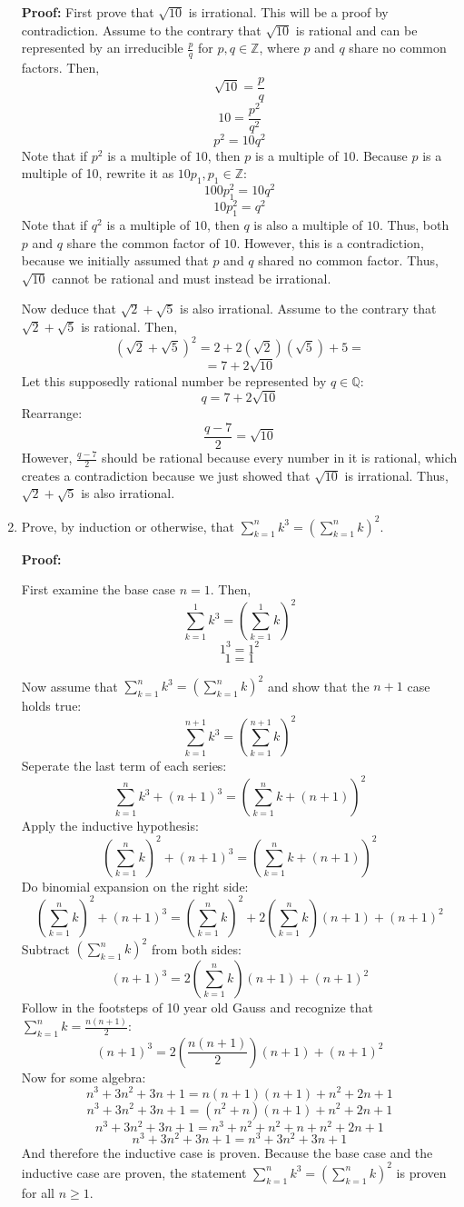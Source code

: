 \documentclass[11pt]{article}
\begin{document}
\begin{enumerate}
\bigskip 
\textbf{Proof: } First prove that $\sqrt{10}$ is irrational. This will be a proof by contradiction. Assume to the contrary that $\sqrt{10}$ is rational and can be represented by an irreducible $\frac{p}{q}$ for $p,q \in \mathbb{Z}$, where $p$ and $q$ share no common factors. Then, 
\[\sqrt{10} = \frac{p}{q} \]
\[10 = \frac{p^2}{q^2}\]
\[p^2 = 10q^2 \]
 Note that if $p^2$ is a multiple of $10$, then $p$ is a multiple of $10$. Because $p$ is a multiple of 10, rewrite it as $10p_1, p_1 \in \mathbb{Z}$: 
\[100p_1 ^2 = 10 q^2\]
\[10p_1^2 = q^2   \]
Note that if $q^2$ is a multiple of $10$, then $q$ is also a multiple of $10$. Thus, both $p$ and $q$ share the common factor of $10$.
However, this is a contradiction, because we initially assumed that $p$ and $q$ shared no common factor. Thus, $\sqrt{10}$ cannot be rational and must instead be irrational. 

Now deduce that $\sqrt{2} + \sqrt{5}$ is also irrational. Assume to the contrary that $\sqrt{2} + \sqrt{5}$ is rational. Then, 
\[(\sqrt{2} + \sqrt{5})^2  = 2 + 2(\sqrt{2})(\sqrt{5}) + 5 = \]
\[ = 7 + 2\sqrt{10}\]
Let this supposedly rational number be represented by $q \in \mathbb{Q}$:
\[q = 7 + 2\sqrt{10}\]
Rearrange:
\[\frac{q-7}{2} = \sqrt{10}\]
However, $\frac{q-7}{2}$ should be rational because every number in it is rational, which creates a contradiction because we just showed that $\sqrt{10}$ is irrational. Thus, $\sqrt{2} + \sqrt{5}$ is also irrational.

\bigskip
\rightline{$\Box$}
\item
Prove, by induction or otherwise, that $\sum_{k=1}^n k^3 = \left(\sum_{k=1}^n k\right)^2$.

\bigskip\textbf{Proof: }

First examine the base case $n = 1$. Then, 
\[ \sum_{k=1}^1 k^3 = \left(\sum_{k=1}^1 k\right)^2 \]
\[ 1^3 = 1^2\]
\[ 1= 1\]

Now assume that $\sum_{k=1}^n k^3 = \left(\sum_{k=1}^n k\right)^2$ and show that the $n+1$ case holds true: 
\[ \sum_{k=1}^{n+1} k^3 = \left(\sum_{k=1}^{n+1} k\right)^2 \]
Seperate the last term of each series:
\[ \sum_{k=1}^{n} k^3 + (n+1)^3 = \left(\sum_{k=1}^n k + (n+1)\right)^2\]
Apply the inductive hypothesis: 
\[ \left(\sum_{k=1}^n k\right)^2 + (n+1)^3 = \left(\sum_{k=1}^n k + (n+1)\right)^2\]
Do binomial expansion on the right side:
\[ \left(\sum_{k=1}^n k\right)^2 + (n+1)^3 = \left( \sum_{k=1}^n k\right)^2 + 2\left( \sum_{k=1}^{n} k\right)(n+1) + (n+1)^2\]
Subtract $\left(\sum_{k=1}^n k\right)^2$ from both sides:
\[ (n+1)^3 = 2\left( \sum_{k=1}^{n} k\right)(n+1) + (n+1)^2\]
Follow in the footsteps of 10 year old Gauss and recognize that $\sum_{k=1}^{n} k = \frac{n(n+1)}{2}$:
\[ (n+1)^3 = 2(\frac{n(n+1)}{2})(n+1) + (n+1)^2\]
Now for some algebra:
\[ n^3 + 3n^2 +3n + 1 = n(n+1)(n+1)+ n^2 + 2n + 1 \]
\[ n^3 + 3n^2 +3n + 1 = (n^2+n)(n+1) + n^2 + 2n + 1\]
\[ n^3 + 3n^2 +3n + 1 = n^3 + n^2 + n^2 + n + n^2 + 2n + 1\]
\[ n^3 + 3n^2 +3n + 1 = n^3 + 3n^2 + 3n + 1\] 
And therefore the inductive case is proven. Because the base case and the inductive case are proven, the statement $\sum_{k=1}^n k^3 = \left(\sum_{k=1}^n k\right)^2$ is proven for all $n \geq 1$.


\end{enumerate}
\end{document}
